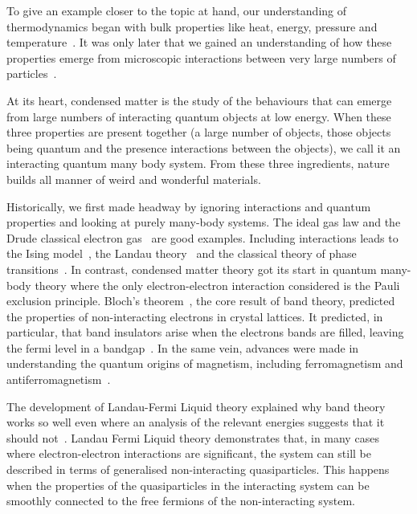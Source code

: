To give an example closer to the topic at hand, our understanding of thermodynamics began with bulk properties like heat, energy, pressure and temperature~\autocite{saslowHistoryThermodynamicsMissing2020}. It was only later that we gained an understanding of how these properties emerge from microscopic interactions between very large numbers of particles~\autocite{flammHistoryOutlookStatistical1998}.

At its heart, condensed matter is the study of the behaviours that can emerge from large numbers of interacting quantum objects at low energy. When these three properties are present together (a large number of objects, those objects being quantum and the presence interactions between the objects), we call it an interacting quantum many body system. From these three ingredients, nature builds all manner of weird and wonderful materials.

Historically, we first made headway by ignoring interactions and quantum properties and looking at purely many-body systems. The ideal gas law and the Drude classical electron gas~\autocite{ashcroftSolidStatePhysics1976} are good examples. Including interactions leads to the Ising model~\autocite{isingBeitragZurTheorie1925}, the Landau theory~\autocite{landau2013fluid} and the classical theory of phase transitions~\autocite{jaegerEhrenfestClassificationPhase1998}. In contrast, condensed matter theory got its start in quantum many-body theory where the only electron-electron interaction considered is the Pauli exclusion principle. Bloch's theorem~\autocite{blochÜberQuantenmechanikElektronen1929}, the core result of band theory, predicted the properties of non-interacting electrons in crystal lattices. It predicted, in particular, that band insulators arise when the electrons bands are filled, leaving the fermi level in a bandgap~\autocite{ashcroftSolidStatePhysics1976}. In the same vein, advances were made in understanding the quantum origins of magnetism, including ferromagnetism and antiferromagnetism~\autocite{MagnetismCondensedMatter}.

The development of Landau-Fermi Liquid theory explained why band theory works so well even where an analysis of the relevant energies suggests that it should not~\autocite{wenQuantumFieldTheory2007}. Landau Fermi Liquid theory demonstrates that, in many cases where electron-electron interactions are significant, the system can still be described in terms of generalised non-interacting quasiparticles. This happens when the properties of the quasiparticles in the interacting system can be smoothly connected to the free fermions of the non-interacting system.

